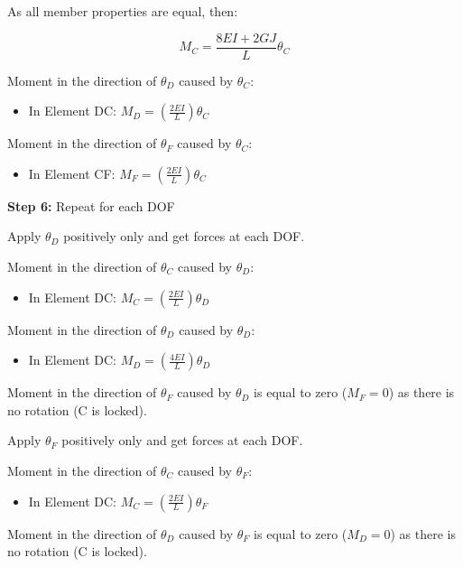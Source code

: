 \documentclass[a4paper,11pt]{article}
\begin{document}
\begin{hidden}
As all member properties are equal, then: 

\begin{equation}
	M_C = \frac{8EI+2GJ}{L}\theta_C
\end{equation}

Moment in the direction of $\theta_D$ caused by $\theta_C$: 

\begin{itemize}
	\item In Element DC: $M_D = \left(\frac{2EI}{L}\right)\theta_C$
\end{itemize}	

Moment in the direction of $\theta_F$ caused by $\theta_C$: 

\begin{itemize}
	\item In Element CF: $M_F = \left(\frac{2EI}{L}\right)\theta_C$
\end{itemize}	

\textbf{Step 6:} Repeat for each DOF

Apply $\theta_D$ positively only and get forces at each DOF. 

Moment in the direction of $\theta_C$ caused by $\theta_D$: 

\begin{itemize}
	\item In Element DC: $M_C = \left(\frac{2EI}{L}\right)\theta_D$
\end{itemize}	

Moment in the direction of $\theta_D$ caused by $\theta_D$: 

\begin{itemize}
	\item In Element DC: $M_D = \left(\frac{4EI}{L}\right)\theta_D$
\end{itemize}	

Moment in the direction of $\theta_F$ caused by $\theta_D$ is equal to zero ($M_F = 0$) as there is no rotation (C is locked).

Apply $\theta_F$ positively only and get forces at each DOF. 

Moment in the direction of $\theta_C$ caused by $\theta_F$: 

\begin{itemize}
	\item In Element DC: $M_C = \left(\frac{2EI}{L}\right)\theta_F$
\end{itemize}	

Moment in the direction of $\theta_D$ caused by $\theta_F$ is equal to zero ($M_D = 0$) as there is no rotation (C is locked).		


\end{hidden}
\end{document}
